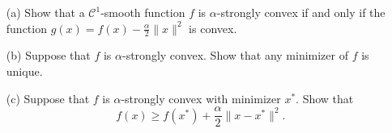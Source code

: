 \documentclass[10pt]{article}
\begin{document}
\maketitle


\begin{problem}[Problem 1]
    \begin{enumerate}[label=(\alph*)]
        \item[(a)] 	Show that a \( \mathcal{C}^1 \)-smooth function \( f \) is \( \alpha \)-strongly convex if and only if the function \( g(x) = f (x) - \frac{\alpha}{2} \|x\|^2 \) is convex.
\item[(b)] 	Suppose that \( f \) is \( \alpha \)-strongly convex. Show that any minimizer of \( f \) is unique. 
\item[(c)] 	Suppose that \( f \) is \( \alpha \)-strongly convex with minimizer \( x^* \). Show that 
\[
f(x) \geq f(x^*) + \frac{\alpha}{2} \|x-x^*\|^2. 
\]
\end{enumerate}

\end{problem}
\end{document}
